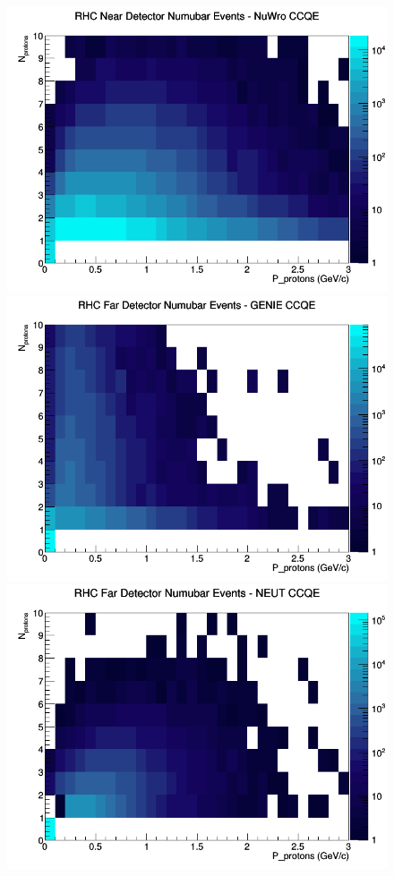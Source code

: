 \documentclass[12pt]{article}
\begin{document}
\begin{figure}[h]
\includegraphics[width=\linewidth]{N_P/nominal/protons/CCQE_RHC_ND_numubar_N_P_NuWro.png}
\endminipage
\newline
{}
\includegraphics[width=\linewidth]{N_P/nominal/protons/CCQE_RHC_FD_numubar_N_P_GENIE.png}
\endminipage
{}
\includegraphics[width=\linewidth]{N_P/nominal/protons/CCQE_RHC_FD_numubar_N_P_NEUT.png}

\end{figure}
\end{document}

